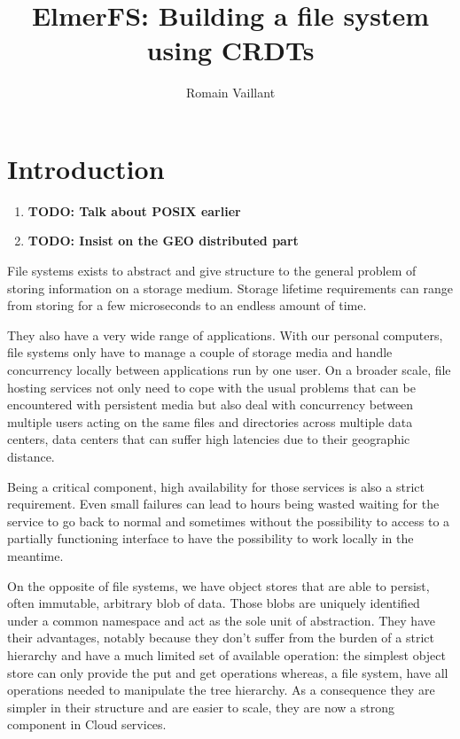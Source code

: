 \documentclass[sigplan, 10pt]{acmart}
\begin{document}
\author{Romain Vaillant}

\title{ElmerFS: Building a file system using CRDTs}

\begin{abstract}
\end{abstract}

\maketitle


\section{Introduction}

\begin{enumerate}
    \item\textbf{TODO: Talk about POSIX earlier}
    \item\textbf{TODO: Insist on the GEO distributed part}
\end{enumerate}

File systems exists to abstract and give structure to the general problem of
storing information on a storage medium. Storage lifetime requirements can range
from storing for a few microseconds to an endless amount of time.

They also have a very wide range of applications. With our personal computers,
file systems only have to manage a couple of storage media and handle
concurrency locally between applications run by one user. On a broader scale, file hosting services not only need to cope
with the usual problems that can be encountered with persistent media but also
deal with concurrency between multiple users acting on the same files and
directories across multiple data centers, data centers that can suffer high
latencies due to their geographic distance.

Being a critical component, high availability for those services is also
a strict requirement. Even small failures can lead to hours being wasted waiting
for the service to go back to normal and sometimes without the possibility to
access to a partially functioning interface to have the possibility to work
locally in the meantime.

On the opposite of file systems, we have object stores that are able to persist,
often immutable, arbitrary blob of data. Those blobs are uniquely identified
under a common namespace and act as the sole unit of abstraction.
They have their advantages, notably because they don't suffer from the burden
of a strict hierarchy and have a much limited set of available operation:
the simplest object store can only provide the put and get operations whereas,
a file system, have all operations needed to manipulate the tree hierarchy.
As a consequence they are simpler in their structure and are easier to scale,
they are now a strong component in Cloud services.
\end{document}
